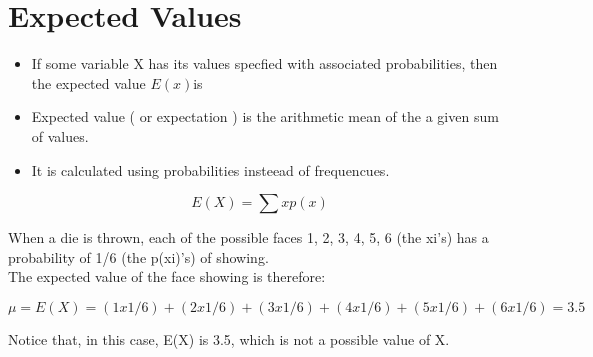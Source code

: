 

\section*{Expected Values}

\begin{itemize}
\item If some variable X has its values specfied with associated probabilities, then the expected value $E(x)$is
\item Expected value ( or expectation ) is the arithmetic mean of the a given sum of values.
\item It is calculated using probabilities insteead of frequencues.
\end{itemize}

\[
E(X) = \sum x p(x)
\]

When a die is thrown, each of the possible faces 1, 2, 3, 4, 5, 6 (the xi's) has a 
probability of 1/6 (the p(xi)'s) of showing.\\ The expected value of the face showing is therefore: 

\[\mu = E(X) = (1 x 1/6) + (2 x 1/6) + (3 x 1/6) + (4 x 1/6) + (5 x 1/6) + (6 x 1/6) = 3.5 \]

Notice that, in this case, E(X) is 3.5, which is not a possible value of X. 



